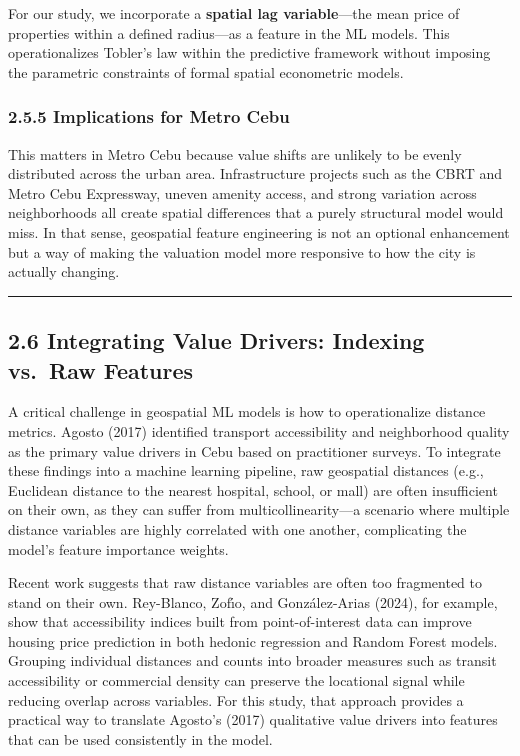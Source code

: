 For our study, we incorporate a \textbf{spatial lag variable}---the mean price of properties within a defined radius---as a feature in the ML models. This operationalizes Tobler's law within the predictive framework without imposing the parametric constraints of formal spatial econometric models.

\subsubsection{\texorpdfstring{\textbf{2.5.5 Implications for Metro Cebu}}{2.5.5 Implications for Metro Cebu}}\label{implications-for-metro-cebu}

This matters in Metro Cebu because value shifts are unlikely to be evenly distributed across the urban area. Infrastructure projects such as the CBRT and Metro Cebu Expressway, uneven amenity access, and strong variation across neighborhoods all create spatial differences that a purely structural model would miss. In that sense, geospatial feature engineering is not an optional enhancement but a way of making the valuation model more responsive to how the city is actually changing.

\begin{center}\rule{0.5\linewidth}{0.5pt}\end{center}

\subsection{\texorpdfstring{\textbf{2.6 Integrating Value Drivers: Indexing vs.~Raw Features}}{2.6 Integrating Value Drivers: Indexing vs.~Raw Features}}\label{integrating-value-drivers-indexing-vs.-raw-features}

A critical challenge in geospatial ML models is how to operationalize distance metrics. Agosto (2017) identified transport accessibility and neighborhood quality as the primary value drivers in Cebu based on practitioner surveys. To integrate these findings into a machine learning pipeline, raw geospatial distances (e.g., Euclidean distance to the nearest hospital, school, or mall) are often insufficient on their own, as they can suffer from multicollinearity---a scenario where multiple distance variables are highly correlated with one another, complicating the model's feature importance weights.

Recent work suggests that raw distance variables are often too fragmented to stand on their own. Rey-Blanco, Zof\'{\i}o, and Gonz\'alez-Arias (2024), for example, show that accessibility indices built from point-of-interest data can improve housing price prediction in both hedonic regression and Random Forest models. Grouping individual distances and counts into broader measures such as transit accessibility or commercial density can preserve the locational signal while reducing overlap across variables. For this study, that approach provides a practical way to translate Agosto's (2017) qualitative value drivers into features that can be used consistently in the model.

